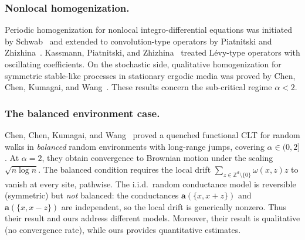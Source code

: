 \documentclass[11pt]{amsart}
\theoremstyle{plain}
\theoremstyle{definition}
\theoremstyle{remark}
\newcommand{\Zd}{\mathbb{Z}^d}
\renewcommand{\a}{\mathbf{a}}
\begin{document}
	\subsubsection{Nonlocal homogenization.}
	Periodic homogenization for nonlocal integro-differential equations was initiated by Schwab~\cite{Schwab2010} and extended to convolution-type operators by Piatnitski and Zhizhina~\cite{PiatnitskiZhizhina2017}.
	Kassmann, Piatnitski, and Zhizhina~\cite{KassmannPiatnitskiZhizhina2019} treated L\'evy-type operators with oscillating coefficients.
	On the stochastic side, qualitative homogenization for symmetric stable-like processes in stationary ergodic media was proved by Chen, Chen, Kumagai, and Wang~\cite{ChenChenKumagaiWang2021SIAM}.
	These results concern the sub-critical regime $\alpha < 2$.
	
	
	\subsubsection{The balanced environment case.}
	Chen, Chen, Kumagai, and Wang~\cite{ChenChenKumagaiWang2021} proved a quenched functional CLT for random walks in \emph{balanced} random environments with long-range jumps, covering $\alpha \in (0,2]$.
	At $\alpha = 2$, they obtain convergence to Brownian motion under the scaling $\sqrt{n \log n}$.
	The balanced condition requires the local drift $\sum_{z \in \Zd \setminus \{0\}} \omega(x,z) z$ to vanish at every site, pathwise.
	The i.i.d.\ random conductance model is reversible (symmetric) but \emph{not} balanced: the conductances $\a(\{x,x{+}z\})$ and $\a(\{x,x{-}z\})$ are independent, so the local drift is generically nonzero.
	Thus their result and ours address different models.
	Moreover, their result is qualitative (no convergence rate), while ours provides quantitative estimates.
	
\end{document}
